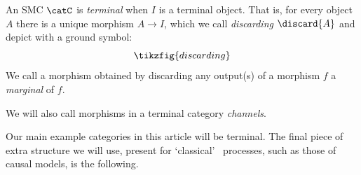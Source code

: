 \documentclass{article}
\begin{document}
\begin{definition}\cite{coecke2008axiomatic,coecke2014terminality} 
An SMC $\catC$ is \emph{terminal} when $I$ is a terminal object. That is, for every object $A$ there is a unique morphism $A \to I$, which we call \emph{discarding} $\discard{A}$ and depict with a ground symbol:
\[
\tikzfig{discarding}
\]
We call a morphism obtained by discarding any output(s) of a morphism $f$ a \emph{marginal} of $f$. 
\end{definition}






We will also call morphisms in a terminal category \emph{channels}. 

Our main example categories in this article will be terminal. The final piece of extra structure we will use, present for `classical' \ processes, such as those of causal models, is the following.
\end{document}
